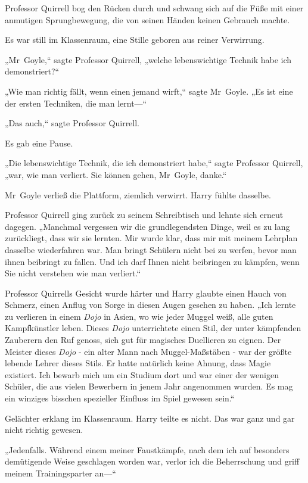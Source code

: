 {Professor Quirrell bog den Rücken durch und schwang sich auf die Füße mit einer anmutigen Sprungbewegung, die von seinen Händen keinen Gebrauch machte.

Es war still im Klassenraum, eine Stille geboren aus reiner Verwirrung.

„Mr~Goyle,“ sagte Professor Quirrell, „welche lebenswichtige Technik habe ich demonstriert?“

„Wie man richtig fällt, wenn einen jemand wirft,“ sagte Mr~Goyle. „Es ist eine der ersten Techniken, die man lernt—“

„Das auch,“ sagte Professor Quirrell.

Es gab eine Pause.

„Die lebenswichtige Technik, die ich demonstriert habe,“ sagte Professor Quirrell, „war, wie man verliert. Sie können gehen, Mr~Goyle, danke.“

Mr~Goyle verließ die Plattform, ziemlich verwirrt. Harry fühlte dasselbe.

Professor Quirrell ging zurück zu seinem Schreibtisch und lehnte sich erneut dagegen. „Manchmal vergessen wir die grundlegendsten Dinge, weil es zu lang zurückliegt, dass wir sie lernten. Mir wurde klar, dass mir mit meinem Lehrplan dasselbe wiederfahren war. Man bringt Schülern nicht bei zu werfen, bevor man ihnen beibringt zu fallen. Und ich darf Ihnen nicht beibringen zu kämpfen, wenn Sie nicht verstehen wie man verliert.“

Professor Quirrells Gesicht wurde härter und Harry glaubte einen Hauch von Schmerz, einen Anflug von Sorge in diesen Augen gesehen zu haben. „Ich lernte zu verlieren in einem \emph{Dojo} in Asien, wo wie jeder Muggel weiß, alle guten Kampfkünstler leben. Dieses \emph{Dojo} unterrichtete einen Stil, der unter kämpfenden Zauberern den Ruf genoss, sich gut für magisches Duellieren zu eignen. Der Meister dieses \emph{Dojo} - ein alter Mann nach Muggel-Maßstäben - war der größte lebende Lehrer dieses Stils. Er hatte natürlich keine Ahnung, dass Magie existiert. Ich bewarb mich um ein Studium dort und war einer der wenigen Schüler, die aus vielen Bewerbern in jenem Jahr angenommen wurden. Es mag ein winziges bisschen spezieller Einfluss im Spiel gewesen sein.“

Gelächter erklang im Klassenraum. Harry teilte es nicht. Das war ganz und gar nicht richtig gewesen.

„Jedenfalls. Während einem meiner Faustkämpfe, nach dem ich auf besonders demütigende Weise geschlagen worden war, verlor ich die Beherrschung und griff meinem Trainingsparter an—“

}
